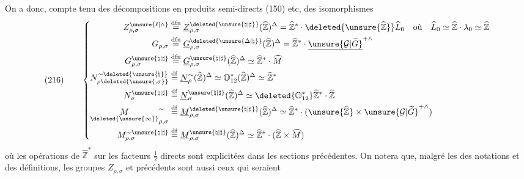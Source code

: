 On a donc, compte tenu des décompositions en produits semi-directs (150) etc,
des isomorphismes
\[
(216)\qquad
\left\{\begin{aligned}
Z_{\rho,\sigma}^{\unsure{\ell|\wedge}}
&\overset{\mathrm{dfn}}{=}
\underline Z_{\rho,\sigma}^{\deleted{\unsure{\natural|\sharp}}}
(\widehat{\mathbb Z})^{\Delta}
=\widehat{\mathbb Z}^{*}\cdot
\deleted{\unsure{\widehat{\mathbb Z}}}\widehat L_0
\quad\text{où}\quad
\widehat L_0\simeq\widehat{\mathbb Z}\cdot\lambda_0\simeq\widehat{\mathbb Z}
\\
G_{\rho,\sigma}
&\overset{\mathrm{dfn}}{=}
\underline G_{\rho,\sigma}^{\deleted{\unsure{\Delta|\natural}}}
(\widehat{\mathbb Z})^{\Delta}
=\widehat{\mathbb Z}^{*}\cdot
\underline{\unsure{\mathcal G|\widetilde G}}^{+\wedge}
\\
G_{\rho,\sigma}^{\unsure{\natural|\sharp}}
&\overset{\mathrm{dfn}}{=}
\underline G_{\rho,\sigma}^{\unsure{\natural|\sharp}}
(\widehat{\mathbb Z})^{\Delta}
\simeq\widehat{\mathbb Z}^{*}\cdot\widehat M
\\
N_{\rho\deleted{\unsure{,\sigma}}}^{\sim\deleted{\unsure{\natural}}}
&\overset{\mathrm{df}}{=}
\underline N_\rho^{\sim}(\widehat{\mathbb Z})^{\Delta}
\simeq\mathbb O_{12}^{*}
(\widehat{\mathbb Z})^{\Delta}\simeq\widehat{\mathbb Z}^{*}
\\
N_\sigma^{\unsure{\natural|\sharp}}
&\overset{\mathrm{df}}{=}
\underline N_\sigma^{\unsure{\natural|\sharp}}
(\widehat{\mathbb Z})^{\Delta}
\simeq\deleted{\mathbb O_{12}^{*}}
\widehat{\mathbb Z}^{*}\cdot\widehat{\mathbb Z}
\\
\underset{\deleted{\unsure{\infty}}}{M}_{\rho,\sigma}^{\sim}
&\overset{\mathrm{df}}{=}
\underline M_{\rho,\sigma}^{\deleted{\unsure{\natural|\sharp}}}
(\widehat{\mathbb Z})^{\Delta}
\simeq\widehat{\mathbb Z}^{*}\cdot
(\unsure{\widehat{\mathbb Z}}\times
\unsure{\mathcal G|\widetilde G}^{+\wedge})
\\
M_{\rho,\sigma}^{\sim\unsure{\natural|\sharp}}
&\overset{\mathrm{df}}{=}
\underline M_{\rho,\sigma}^{\unsure{\natural|\sharp}}
(\widehat{\mathbb Z})^{\Delta}
\simeq\widehat{\mathbb Z}^{*}\cdot
(\widehat{\mathbb Z}\times\widehat M)
\end{aligned}\right.
\]
où les opérations de $\widehat{\mathbb Z}^{*}$ sur les
 facteurs
$\frac12$ directs sont explicitées dans les sections précédentes.
On notera que, malgré les  des
notations et des définitions, les groupes 
$Z_{\rho,\sigma}$ et précédents sont aussi ceux qui seraient
